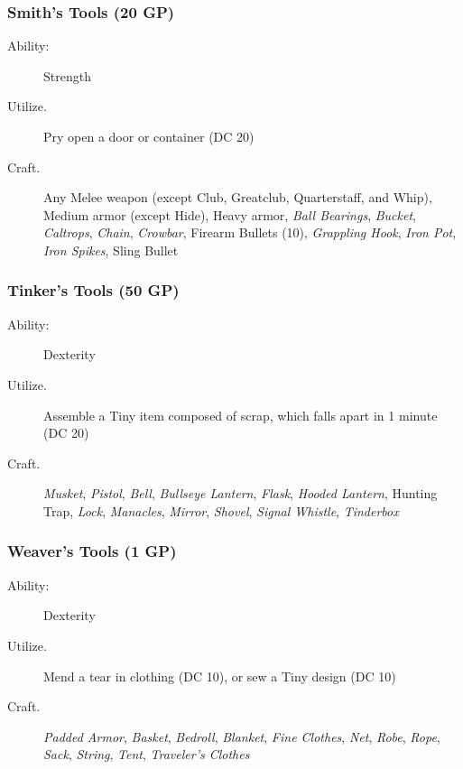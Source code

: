 \documentclass[10pt,a4paper,twoside,bg=print,twocolumn,openany,nodeprecatedcode]{dndbook}
\begin{document}
\subsubsection{Smith's Tools (20 GP)}

\begin{description}
\item[Ability:]
Strength
\item[Utilize.]
Pry open a door or container (DC 20)
\item[Craft.]
Any Melee weapon (except Club, Greatclub, Quarterstaff, and Whip), Medium armor (except Hide), Heavy armor, \textit{Ball Bearings}, \textit{Bucket}, \textit{Caltrops}, \textit{Chain}, \textit{Crowbar}, Firearm Bullets (10), \textit{Grappling Hook}, \textit{Iron Pot}, \textit{Iron Spikes}, Sling Bullet
\end{description}

\subsubsection{Tinker's Tools (50 GP)}

\begin{description}
\item[Ability:]
Dexterity
\item[Utilize.]
Assemble a Tiny item composed of scrap, which falls apart in 1 minute (DC 20)
\item[Craft.]
\textit{Musket}, \textit{Pistol}, \textit{Bell}, \textit{Bullseye Lantern}, \textit{Flask}, \textit{Hooded Lantern}, Hunting Trap, \textit{Lock}, \textit{Manacles}, \textit{Mirror}, \textit{Shovel}, \textit{Signal Whistle}, \textit{Tinderbox}
\end{description}

\subsubsection{Weaver's Tools (1 GP)}

\begin{description}
\item[Ability:]
Dexterity
\item[Utilize.]
Mend a tear in clothing (DC 10), or sew a Tiny design (DC 10)
\item[Craft.]
\textit{Padded Armor}, \textit{Basket}, \textit{Bedroll}, \textit{Blanket}, \textit{Fine Clothes}, \textit{Net}, \textit{Robe}, \textit{Rope}, \textit{Sack}, \textit{String}, \textit{Tent}, \textit{Traveler's Clothes}
\end{description}
\end{document}
